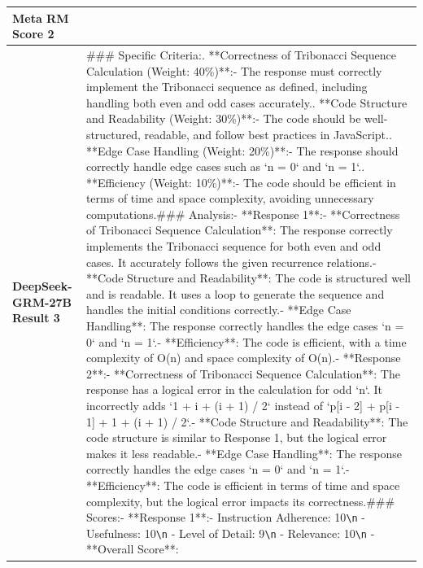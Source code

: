\documentclass{article} %
\newcommand{\SGRM}{DeepSeek-GRM-27B\xspace}
\begin{document}
\begin{center}
\begin{longtable}{p{2.5cm}|p{10cm}}
   \textbf{Meta RM Score 2}   &     {\color{mydarkgreen}{1.3126}}   \\ \midrule
   \textbf{\SGRM Result 3}   &  \#\#\# Specific Criteria:\newline1. **Correctness of Tribonacci Sequence Calculation (Weight: 40\%)**:\newline   - The response must correctly implement the Tribonacci sequence as defined, including handling both even and odd cases accurately.\newline2. **Code Structure and Readability (Weight: 30\%)**:\newline   - The code should be well-structured, readable, and follow best practices in JavaScript.\newline3. **Edge Case Handling (Weight: 20\%)**:\newline   - The response should correctly handle edge cases such as `n = 0` and `n = 1`.\newline4. **Efficiency (Weight: 10\%)**:\newline   - The code should be efficient in terms of time and space complexity, avoiding unnecessary computations.\newline\newline\#\#\# Analysis:\newline- **Response 1**:\newline  - **Correctness of Tribonacci Sequence Calculation**: The response correctly implements the Tribonacci sequence for both even and odd cases. It accurately follows the given recurrence relations.\newline  - **Code Structure and Readability**: The code is structured well and is readable. It uses a loop to generate the sequence and handles the initial conditions correctly.\newline  - **Edge Case Handling**: The response correctly handles the edge cases `n = 0` and `n = 1`.\newline  - **Efficiency**: The code is efficient, with a time complexity of O(n) and space complexity of O(n).\newline\newline- **Response 2**:\newline  - **Correctness of Tribonacci Sequence Calculation**: The response has a logical error in the calculation for odd `n`. It incorrectly adds `1 + i + (i + 1) / 2` instead of `p[i - 2] + p[i - 1] + 1 + (i + 1) / 2`.\newline  - **Code Structure and Readability**: The code structure is similar to Response 1, but the logical error makes it less readable.\newline  - **Edge Case Handling**: The response correctly handles the edge cases `n = 0` and `n = 1`.\newline  - **Efficiency**: The code is efficient in terms of time and space complexity, but the logical error impacts its correctness.\newline\newline\#\#\# Scores:\newline- **Response 1**:\newline  - Instruction Adherence: 10\verb|\n|  - Usefulness: 10\verb|\n|  - Level of Detail: 9\verb|\n|  - Relevance: 10\verb|\n|  - **Overall Score**: 
\end{longtable}
\end{center}
\end{document}
